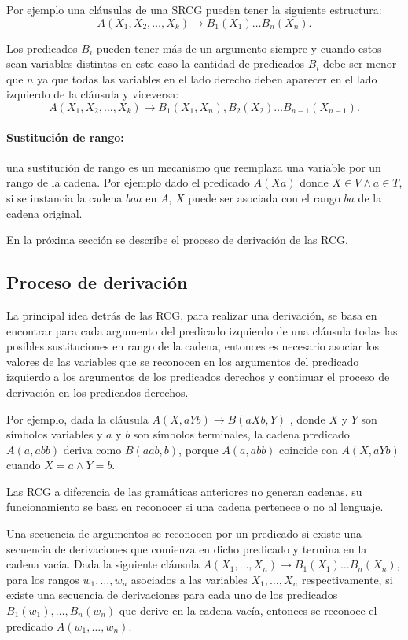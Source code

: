 \documentclass[12pt]{article}
\begin{document}
Por ejemplo una cláusulas de una SRCG pueden tener la siguiente estructura:
\[
    A(X_1, X_2, \ldots, X_k) \to B_1(X_1) \ldots B_n(X_n).
\]

Los predicados $B_i$ pueden tener más de un argumento siempre y cuando estos sean variables distintas en este caso
la cantidad de predicados $B_i$ debe ser menor que $n$ ya que todas las variables en el lado derecho deben aparecer en
el lado izquierdo de la cláusula y viceversa:
\[
    A(X_1, X_2, \ldots, X_k) \to B_1(X_1,X_n),B_2(X_2) \ldots B_{n-1}(X_{n-1}).
\]

\paragraph{Sustitución de rango:} una sustitución de rango es un mecanismo que reemplaza una variable por un rango de la cadena.
Por ejemplo dado el predicado $A(Xa)$ donde $X \in V \wedge a \in T$, si se instancia la cadena $baa$ en $A$, $X$ puede
ser asociada con el rango $ba$ de la cadena original.

En la próxima sección se describe el proceso de derivación de las RCG.
\subsection{Proceso de derivación}

La principal idea detrás de las RCG, para realizar una derivación, se basa en encontrar para cada argumento del predicado izquierdo de una cláusula todas las
posibles sustituciones en rango de la cadena, entonces es necesario asociar los valores de las variables que se reconocen
en los argumentos del predicado izquierdo a los argumentos de los predicados derechos y continuar
el proceso de derivación en los predicados derechos.

Por ejemplo, dada la cláusula $A(X,aYb)\to B(aXb,Y)$ , donde $X$ y $Y$ son símbolos variables y $a$ y $b$
son símbolos terminales, la cadena predicado $A(a,abb)$ deriva como $B(aab,b)$, porque $A(a,abb)$
coincide con $A(X,aYb)$ cuando $ X=a \wedge Y=b$.

Las RCG a diferencia de las gramáticas anteriores no generan cadenas, su funcionamiento se basa en reconocer si una cadena pertenece o no al lenguaje.

Una secuencia de argumentos se reconocen por un predicado si existe una secuencia de derivaciones que comienza
en dicho predicado y termina en la cadena vacía. Dada la siguiente cláusula $A(X_1,\ldots,X_n)\to B_1(X_1)\ldots B_n(X_n)$,
para los rangos $w_1,\ldots,w_n$ asociados a las variables $X_1,\ldots,X_n$ respectivamente, si existe una
secuencia de derivaciones para cada uno de los predicados $B_1(w_1),\ldots,B_n(w_n)$ que derive en la cadena vacía,
entonces se reconoce el predicado $A(w_1,\ldots,w_n)$.
\end{document}
